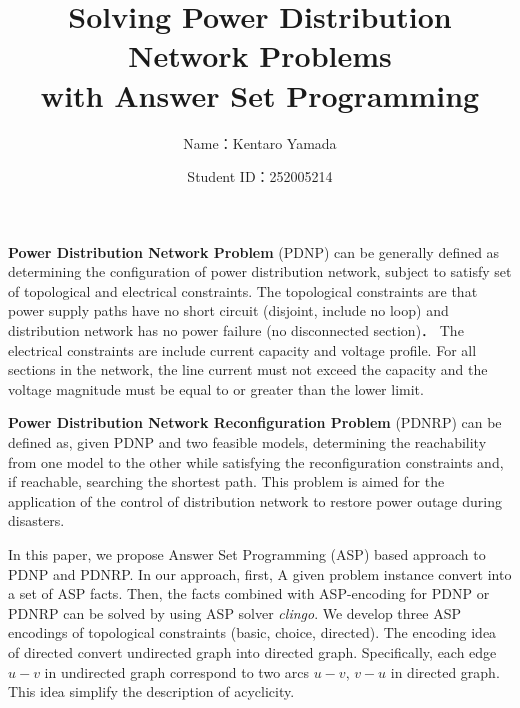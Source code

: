 \documentclass[dvipdfmx,a4paper]{jsarticle}
\title{Solving Power Distribution Network Problems \\ with Answer Set Programming}
\author{Name：Kentaro Yamada}
\date{Student ID：252005214}
\begin{document}
\maketitle

\textbf{Power Distribution Network Problem} (PDNP) can be generally 
defined as determining the configuration of power distribution network,
subject to satisfy set of topological and electrical constraints. 
% 
The topological constraints are that power supply paths have
no short circuit (disjoint, include no loop) and
distribution network has no power failure (no disconnected section)．
%
The electrical constraints are include current capacity
and voltage profile.
%
For all sections in the network, the line current must not exceed 
the capacity and the voltage magnitude must be equal to or greater 
than the lower limit.

%

\textbf{Power Distribution Network Reconfiguration Problem} (PDNRP) can be
defined as, given PDNP and two feasible models, determining the reachability
from one model to the other while satisfying the reconfiguration constraints and,
if reachable, searching the shortest path.
%
This problem is aimed for the application  of the control of distribution 
network to restore power outage during disasters.


In this paper, we propose Answer Set Programming (ASP) based approach to
PDNP and PDNRP.
%
In our approach, first, A given problem instance convert into 
a set of ASP facts. 
%
Then, the facts combined with ASP-encoding
for PDNP or PDNRP can be solved by using ASP solver 
\textit{clingo}.
%
We develop three ASP encodings of topological constraints
(\textsf{basic}, \textsf{choice}, \textsf{directed}).
%
The encoding idea of \textsf{directed} convert undirected graph
into directed graph. 
%
Specifically, each edge $u-v$ in undirected graph correspond to 
two arcs $u-v$, $v-u$ in directed graph.
%
This idea simplify the description of acyclicity.
\end{document}
